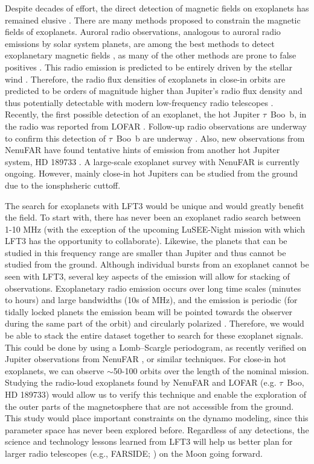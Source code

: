 Despite decades of effort, the direct detection of magnetic fields on exoplanets has remained elusive \citep{G2015,Brain2024}. There are many methods proposed to constrain the magnetic fields of exoplanets. Auroral radio observations, analogous to auroral radio emissions by solar system planets, are among the best methods to detect exoplanetary magnetic fields \citep{Zarka2007,Zarka2015SKA,G2015,Brain2024}, as many of the other methods are prone to false positives \citep{G2015,Turner2016a,Route2019}. This radio emission is predicted to be entirely driven by the stellar wind \citep{Zarka2007}. Therefore, the radio flux densities of exoplanets in close-in orbits are predicted to be orders of magnitude higher than Jupiter's radio flux density \citep{Griessmeier2007_AA,Griessmeier17PREVIII} and thus potentially detectable with modern low-frequency radio telescopes \citep{Zarka2015SKA,Griessmeier17PREVIII,Turner2019}. Recently, the first possible detection of an exoplanet, the hot Jupiter $\tau$~Boo~b, in the radio was reported from LOFAR \citep{Turner2021_Radio}. Follow-up radio observations are underway to confirm this detection of $\tau$~Boo~b are underway \citep{Turner2023_PRE,Turner2024}. Also, new observations from NenuFAR have found tentative hints of emission from another hot Jupiter system, HD 189733 \citep{Zhang2025}. A large-scale exoplanet survey with NenuFAR is currently ongoing. However, mainly close-in hot Jupiters can be studied from the ground due to the ionsphsheric cuttoff. 

The search for exoplanets with LFT3 would be unique and would greatly benefit the field. To start with, there has never been an exoplanet radio search between 1-10 MHz (with the exception of the upcoming LuSEE-Night mission with which LFT3 has the opportunity to collaborate). Likewise, the planets that can be studied in this frequency range are smaller than Jupiter and thus cannot be studied from the ground. Although individual bursts from an exoplanet cannot be seen with LFT3, several key aspects of the emission will allow for stacking of observations. Exoplanetary radio emission occurs over long time scales (minutes to hours) and large bandwidths (10s of MHz), and the emission is periodic (for tidally locked planets the emission beam will be pointed towards the observer during the same part of the orbit) and circularly polarized \citep{Zarka2007}. Therefore, we would be able to stack the entire dataset together to search for these exoplanet signals. This could be done by using a Lomb–Scargle periodogram, as recently verified on Jupiter observations from NenuFAR \citep{Louis2025}, or similar techniques. For close-in hot exoplanets, we can observe $\sim$50-100 orbits over the length of the nominal mission. Studying the radio-loud exoplanets found by NenuFAR and LOFAR (e.g. $\tau$~Boo, HD 189733) would allow us to verify this technique and enable the exploration of the outer parts of the magnetosphere that are not accessible from the ground. This study would place important constraints on the dynamo modeling, since this parameter space has never been explored before. Regardless of any detections, the science and technology lessons learned from LFT3 will help us better plan for larger radio telescopes (e.g., FARSIDE; \citealt{Burns2021_RSPTA}) on the Moon going forward.

